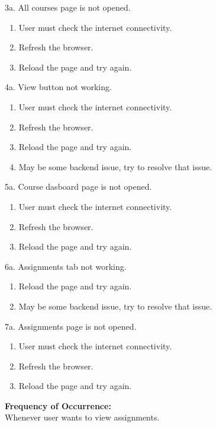 \documentclass[12pt]{article}
\begin{document}
3a. All courses page is not opened.
\begin{enumerate}
\item User must check the internet connectivity.
\item Refresh the browser.
\item Reload the page and try again.
\end{enumerate}
4a. View button not working.
\begin{enumerate}
\item User must check the internet connectivity.
\item Refresh the browser.
\item Reload the page and try again.
\item May be some backend issue, try to resolve that issue.
\end{enumerate}
5a. Course dasboard page is not opened.
\begin{enumerate}
\item User must check the internet connectivity.
\item Refresh the browser.
\item Reload the page and try again.
\end{enumerate}
6a. Assignments tab not working.
\begin{enumerate}
\item Reload the page and try again.
\item May be some backend issue, try to resolve that issue.
\end{enumerate}
7a. Assignments page is not opened.
\begin{enumerate}
\item User must check the internet connectivity.
\item Refresh the browser.
\item Reload the page and try again.
\end{enumerate}
\textbf{Frequency of Occurrence:}\\
Whenever user wants to view assignments.
\end{document}
